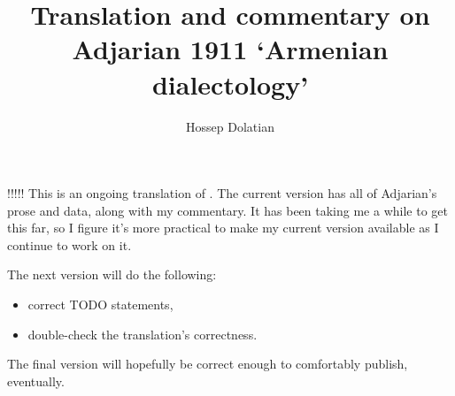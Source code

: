 \documentclass{book}
\title{Translation and commentary  on Adjarian 1911 `Armenian dialectology'}	%
\author{Hossep Dolatian}		%
\begin{document}
 


!!!!! This is an ongoing translation of \citet{Adjarian-1911-DialectologyBook}. The current version has all of Adjarian's prose and data, along with my commentary. It has been taking me a while to get this far, so I figure it's more practical to make my current version available as I continue to work on it.

The next version will do the following:
\begin{itemize}
	\item 
	correct  TODO statements,
	\item  double-check the translation's correctness.
\end{itemize} 

The final version  will hopefully be correct enough to comfortably publish, eventually. 





\maketitle





\tableofcontents





 
\newcommand{\doi}[1]{\href{http://dx.doi.org/#1}{http://dx.doi.org/#1}}	%
\end{document}
